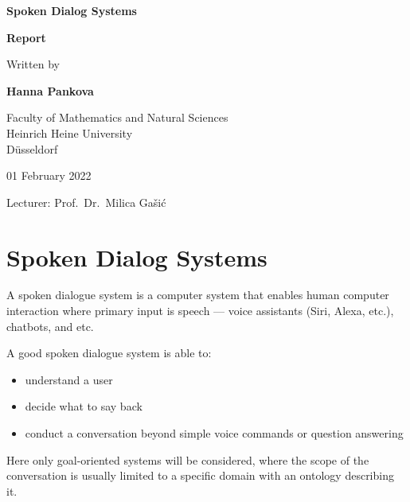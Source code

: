 \documentclass[12pt,titlepage,a4paper]{article}
\begin{document}
\begin{titlepage}
\begin{center}

\textbf{\LARGE Spoken Dialog Systems}

\bigskip\bigskip
\textbf{Report}

\bigskip\bigskip\bigskip
Written by

\bigskip
\textbf{Hanna Pankova}


\vfill
Faculty of Mathematics and Natural Sciences\\ 
Heinrich Heine University \\
D\"usseldorf

\bigskip
01 February 2022

\bigskip
Lecturer: Prof.\ Dr.\ Milica Ga\v{s}i\'{c}

\end{center}
\end{titlepage}

\thispagestyle{empty}\mbox{}
\setcounter{page}{0}

\tableofcontents

\pagebreak
\section{Spoken Dialog Systems}
A spoken dialogue system is a computer system that enables human computer interaction where primary input is speech --- voice assistants (Siri, Alexa, etc.), chatbots, and etc. \par

A good spoken dialogue system is able to:
\begin{itemize}
     \item understand a user
     \item decide what to say back
     \item conduct a conversation beyond simple voice commands or question answering
\end{itemize}

Here only goal-oriented systems will be considered, where the scope of the conversation is usually limited to a specific domain with an ontology describing it.
\end{document}

